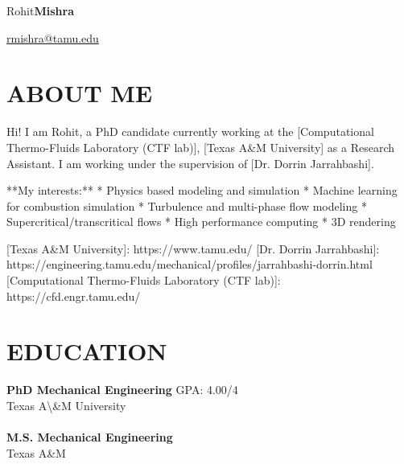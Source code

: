 \documentclass{res}
\begin{document}
	\hspace*{-0.05\textwidth}
	\begin{minipage}[t]{0.6\textwidth}
	\begin{flushleft}
	\vspace*{\fill}
	{\fontsize{45}{45}\selectfont Rohit\textbf{Mishra}}
	\end{flushleft}
	\end{minipage}
	\begin{minipage}[t]{0.44\textwidth}
	\begin{flushright}
	\href{mailto:rmishra@tamu.edu}{rmishra@tamu.edu} \\ 
	\end{flushright}
	\end{minipage}

	\begin{resume}
	
	
	\section{\MakeUppercase{About me}} \vskip 0.15in
	Hi! I am Rohit, a PhD candidate currently working at the [Computational Thermo-Fluids Laboratory (CTF lab)], [Texas A\&M University] as a Research Assistant. I am working under the supervision of [Dr. Dorrin Jarrahbashi].

**My interests:**
* Physics based modeling and simulation
* Machine learning for combustion simulation
* Turbulence and multi-phase flow modeling
* Supercritical/transcritical flows
* High performance computing
* 3D rendering



[Texas A\&M University]: https://www.tamu.edu/
[Dr. Dorrin Jarrahbashi]: https://engineering.tamu.edu/mechanical/profiles/jarrahbashi-dorrin.html
[Computational Thermo-Fluids Laboratory (CTF lab)]: https://cfd.engr.tamu.edu/

	
	
	
	\section{\MakeUppercase{Education}} \vskip 0.15in
	
	{\bf PhD Mechanical Engineering} \hfill GPA: 4.00/4 \\
	{Texas A\textbackslash \&M University \hfill } \\ \\
	{\bf M.S. Mechanical Engineering} \hfill  \\
	{Texas A\&M \hfill } 
	

\end{resume}
\end{document}
